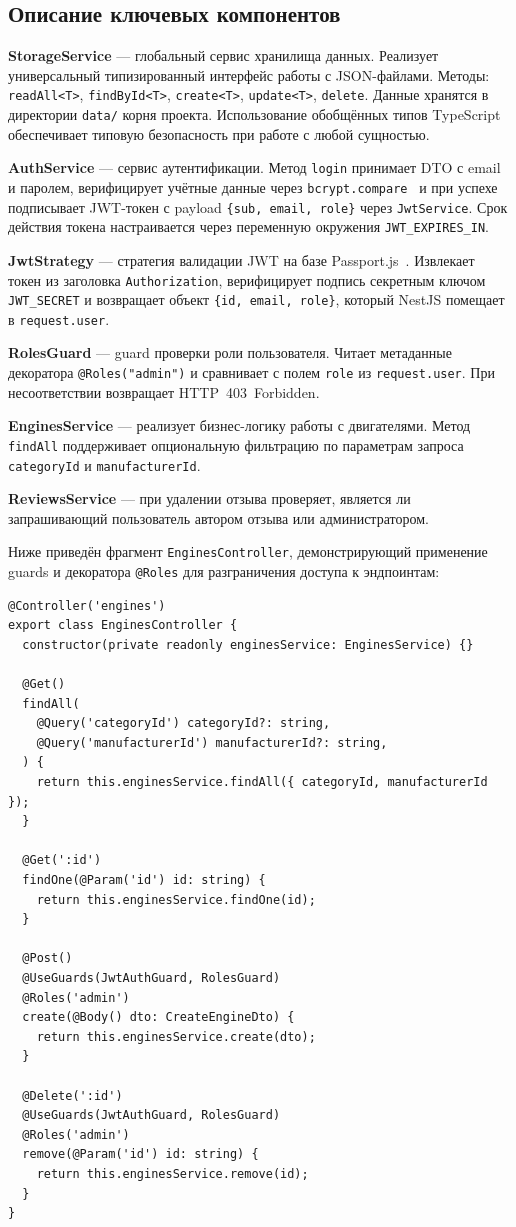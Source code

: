 \documentclass[14pt,a4paper]{extarticle}
\begin{document}
\subsection{Описание ключевых компонентов}

\textbf{StorageService} --- глобальный сервис хранилища данных. Реализует универсальный типизированный интерфейс работы с JSON-файлами. Методы: \texttt{readAll<T>}, \texttt{findById<T>}, \texttt{create<T>}, \texttt{update<T>}, \texttt{delete}. Данные хранятся в директории \texttt{data/} корня проекта. Использование обобщённых типов TypeScript обеспечивает типовую безопасность при работе с любой сущностью.

\textbf{AuthService} --- сервис аутентификации. Метод \texttt{login} принимает DTO с email и паролем, верифицирует учётные данные через \texttt{bcrypt.compare}~\cite{bcrypt} и при успехе подписывает JWT-токен с payload \texttt{\{sub, email, role\}} через \texttt{JwtService}. Срок действия токена настраивается через переменную окружения \texttt{JWT\_EXPIRES\_IN}.

\textbf{JwtStrategy} --- стратегия валидации JWT на базе Passport.js~\cite{passport}. Извлекает токен из заголовка \texttt{Authorization}, верифицирует подпись секретным ключом \texttt{JWT\_SECRET} и возвращает объект \texttt{\{id, email, role\}}, который NestJS помещает в \texttt{request.user}.

\textbf{RolesGuard} --- guard проверки роли пользователя. Читает метаданные декоратора \texttt{@Roles("admin")} и сравнивает с полем \texttt{role} из \texttt{request.user}. При несоответствии возвращает HTTP~403~Forbidden.

\textbf{EnginesService} --- реализует бизнес-логику работы с двигателями. Метод \texttt{findAll} поддерживает опциональную фильтрацию по параметрам запроса \texttt{categoryId} и \texttt{manufacturerId}.

\textbf{ReviewsService} --- при удалении отзыва проверяет, является ли запрашивающий пользователь автором отзыва или администратором.

Ниже приведён фрагмент \texttt{EnginesController}, демонстрирующий применение guards и декоратора \texttt{@Roles} для разграничения доступа к эндпоинтам:

\begin{lstlisting}
@Controller('engines')
export class EnginesController {
  constructor(private readonly enginesService: EnginesService) {}

  @Get()
  findAll(
    @Query('categoryId') categoryId?: string,
    @Query('manufacturerId') manufacturerId?: string,
  ) {
    return this.enginesService.findAll({ categoryId, manufacturerId });
  }

  @Get(':id')
  findOne(@Param('id') id: string) {
    return this.enginesService.findOne(id);
  }

  @Post()
  @UseGuards(JwtAuthGuard, RolesGuard)
  @Roles('admin')
  create(@Body() dto: CreateEngineDto) {
    return this.enginesService.create(dto);
  }

  @Delete(':id')
  @UseGuards(JwtAuthGuard, RolesGuard)
  @Roles('admin')
  remove(@Param('id') id: string) {
    return this.enginesService.remove(id);
  }
}
\end{lstlisting}
\end{document}
